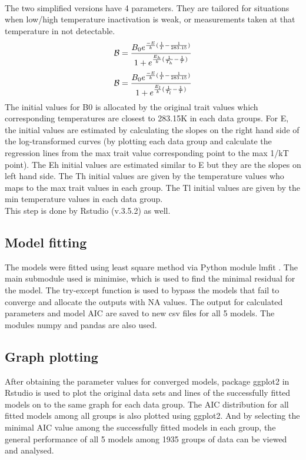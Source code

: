 \documentclass[12pt,a4paper]{article}
\begin{document}
\\
The two simplified versions have 4 parameters. They are tailored for situations when low/high temperature inactivation is weak, or measurements taken at that temperature in not detectable.
\begin{equation}
\mathcal B = \frac{B_0e^{\frac{-E}{k}(\frac{1}{T}-\frac{1}{283.15})}}{1+e^{\frac{E_h}{k}(\frac{1}{T_h}-\frac{1}{T})}}
\\
\end{equation}
\begin{equation}
\mathcal B = \frac{B_0e^{\frac{-E}{k}(\frac{1}{T}-\frac{1}{283.15})}}{1+e^{\frac{E_l}{k}(\frac{1}{T_l}-\frac{1}{T})}}
\\
\end{equation}
The initial values for B0 is allocated by the original trait values which corresponding temperatures are closest to 283.15K in each data groups. For E, the initial values are estimated by calculating the slopes on the right hand side of the log-transformed curves (by plotting each data group and calculate the regression lines from the max trait value corresponding point to the max 1/kT point). The Eh initial values are estimated similar to E but they are the slopes on left hand side. The Th initial values are given by the temperature values who maps to the max trait values in each group. The Tl initial values are given by the min temperature values in each data group.
\\
This step is done by Rstudio (v.3.5.2) \cite{Rstudio} as well.
\subsection{Model fitting}
The models were fitted using least square method via Python \cite{python} module lmfit \cite{lmfit}. The main submodule used is minimise, which is used to find the minimal residual for the model. The try-except function is used to bypass the models that fail to converge and allocate the outputs with NA values. The output for calculated parameters and model AIC are saved to new csv files for all 5 models. The modules numpy \cite{numpy} and pandas \cite{pandas} are also used.
\subsection{Graph plotting}
After obtaining the parameter values for converged models, package ggplot2 \cite{ggplot} in Rstudio \cite{Rstudio} is used to plot the original data sets and lines of the successfully fitted models on to the same graph for each data group. The AIC distribution for all fitted models among all groups is also plotted using ggplot2. And by selecting the minimal AIC value among the successfully fitted models in each group, the general performance of all 5 models among 1935 groups of data can be viewed and analysed.
\end{document}
